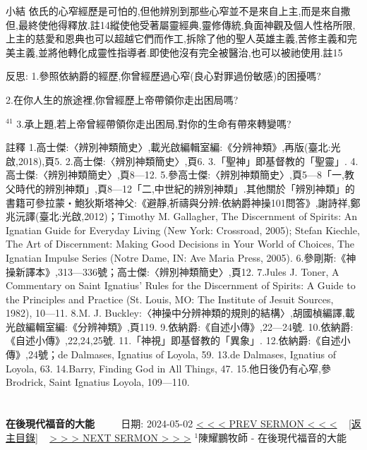 \documentclass{book}
\begin{document}
小結
依氏的心窄經歷是可怕的,但他辨別到那些心窄並不是來自上主,而是來自撒但,最終使他得釋放.註14縱使他受著屬靈經典,靈修傳統,負面神觀及個人性格所限,上主的慈愛和恩典也可以超越它們而作工,拆除了他的聖人英雄主義,苦修主義和完美主義,並將他轉化成靈性指導者.即使他沒有完全被醫治,也可以被祂使用.註15

反思:
1.參照依納爵的經歷,你曾經歷過心窄(良心對罪過份敏感)的困擾嗎?

2.在你人生的旅途裡,你曾經歷上帝帶領你走出困局嗎?

$^{41}$
3.承上題,若上帝曾經帶領你走出困局,對你的生命有帶來轉變嗎?

註釋
1.高士傑:〈辨別神類簡史〉,載光啟編輯室編:《分辨神類》,再版(臺北:光啟,2018),頁5.
2.高士傑:〈辨別神類簡史〉,頁6.
3.「聖神」即基督教的「聖靈」.
4.高士傑:〈辨別神類簡史〉,頁8—12.
5.參高士傑:〈辨別神類簡史〉,頁5—8「一,教父時代的辨別神類」,頁8—12「二,中世紀的辨別神類」.其他關於「辨別神類」的書籍可參拉蒙‧鮑狄斯塔神父:《避靜,祈禱與分辨:依納爵神操101問答》,謝詩祥,鄭兆沅譯(臺北:光啟,2012)；Timothy M. Gallagher, The Discernment of Spirits: An Ignatian Guide for Everyday Living (New York: Crossroad, 2005); Stefan Kiechle, The Art of Discernment: Making Good Decisions in Your World of Choices, The Ignatian Impulse Series (Notre Dame, IN: Ave Maria Press, 2005).
6.參剛斯:《神操新譯本》,313—336號；高士傑:〈辨別神類簡史〉,頁12.
7.Jules J. Toner, A Commentary on Saint Ignatius’ Rules for the Discernment of Spirits: A Guide to the Principles and Practice (St. Louis, MO: The Institute of Jesuit Sources, 1982), 10—11.
8.M. J. Buckley:〈神操中分辨神類的規則的結構〉,胡國楨編譯,載光啟編輯室編:《分辨神類》,頁119.
9.依納爵:《自述小傳》,22—24號.
10.依納爵:《自述小傳》,22,24,25號.
11.「神視」即基督教的「異象」.
12.依納爵:《自述小傳》,24號；de Dalmases, Ignatius of Loyola, 59.
13.de Dalmases, Ignatius of Loyola, 63.
14.Barry, Finding God in All Things, 47.
15.他日後仍有心窄,參Brodrick, Saint Ignatius Loyola, 109—110.
\newpage



\section{}
\label{sec:13}
\textbf{在後現代福音的大能}
\newline
\newline
~~~~ 日期: 2024-05-02
\newline
\newline
\hyperref[sec:12]{\small{< < < PREV SERMON < < <}}
~
\hyperref[sec:index]{\small{[返主目錄]}}
~
\hyperref[sec:14]{\small{> > > NEXT SERMON > > >}}
\newline
\newline
$^{1}$陳耀鵬牧師 - 在後現代福音的大能
\end{document}
